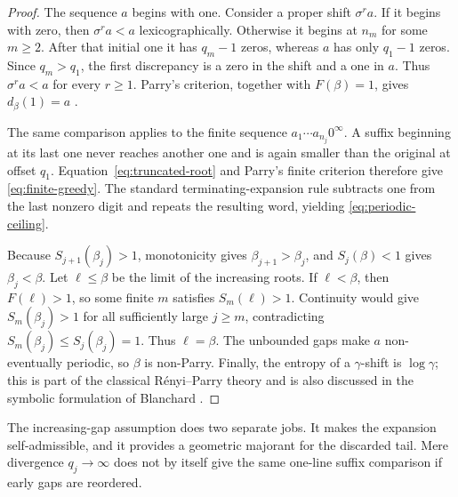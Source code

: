 \begin{proof}
The sequence $a$ begins with one.  Consider a proper shift $\sigma^r a$.  If it begins with zero, then $\sigma^r a<a$ lexicographically.  Otherwise it begins at $n_m$ for some $m\geq2$.  After that initial one it has $q_m-1$ zeros, whereas $a$ has only $q_1-1$ zeros.  Since $q_m>q_1$, the first discrepancy is a zero in the shift and a one in $a$.  Thus $\sigma^r a<a$ for every $r\geq1$.  Parry's criterion, together with $F(\beta)=1$, gives $d_\beta(1)=a$ \cite{parry_1960}.

The same comparison applies to the finite sequence $a_1\cdots a_{n_j}0^\infty$.  A suffix beginning at its last one never reaches another one and is again smaller than the original at offset $q_1$.  Equation~\eqref{eq:truncated-root} and Parry's finite criterion therefore give \eqref{eq:finite-greedy}.  The standard terminating-expansion rule subtracts one from the last nonzero digit and repeats the resulting word, yielding \eqref{eq:periodic-ceiling}.

Because $S_{j+1}(\beta_j)>1$, monotonicity gives $\beta_{j+1}>\beta_j$, and $S_j(\beta)<1$ gives $\beta_j<\beta$.  Let $\ell\leq\beta$ be the limit of the increasing roots.  If $\ell<\beta$, then $F(\ell)>1$, so some finite $m$ satisfies $S_m(\ell)>1$.  Continuity would give $S_m(\beta_j)>1$ for all sufficiently large $j\geq m$, contradicting $S_m(\beta_j)\leq S_j(\beta_j)=1$.  Thus $\ell=\beta$.  The unbounded gaps make $a$ non-eventually periodic, so $\beta$ is non-Parry.  Finally, the entropy of a $\gamma$-shift is $\log\gamma$; this is part of the classical R\'enyi--Parry theory and is also discussed in the symbolic formulation of Blanchard \cite{renyi_1957,parry_1960,blanchard_1989}.
\end{proof}

\begin{remark}
The increasing-gap assumption does two separate jobs.  It makes the expansion self-admissible, and it provides a geometric majorant for the discarded tail.  Mere divergence $q_j\to\infty$ does not by itself give the same one-line suffix comparison if early gaps are reordered.
\end{remark}
